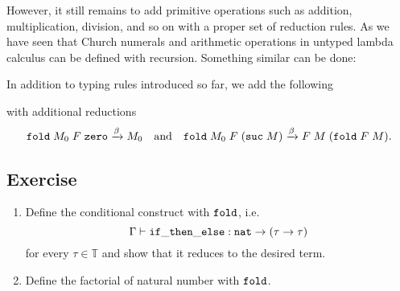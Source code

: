 However, it still remains to add primitive operations such as addition,
multiplication, division, and so on with a proper set of reduction rules. As we
have seen that Church numerals and arithmetic operations in untyped lambda
calculus can be defined with recursion. Something similar can be done:
\begin{definition}
  In addition to typing rules introduced so far, we add the following
  \begin{prooftree}
  \end{prooftree}
  with additional reductions
  \[
    \fold\;M_0\;F\;\zero
    \xrightarrow{\beta}
    M_0
    \quad\text{and}\quad
    \fold\;M_0\;F\;(\suc\;M)
    \xrightarrow{\beta}
    F\;M\;(\fold\;F\;M).
  \]
\end{definition}
\begin{definition}
\end{definition}
\subsection*{Exercise}
\begin{enumerate}
  \item Define the conditional construct with $\fold$, i.e.\
    \[
      \Gamma \vdash \mathtt{if\_then\_else} : \nat \to (\tau \to \tau)
    \]
    for every $\tau \in \mathbb{T}$ and show that it reduces to the desired
    term.
  \item Define the factorial of natural number with $\fold$.
\end{enumerate}


 

